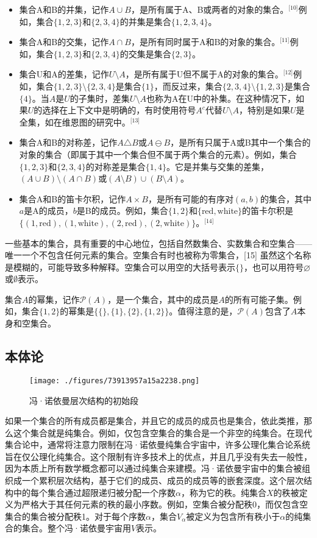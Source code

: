 \begin{itemize}
\item 集合A和B的并集，记作$A \cup B$，是所有属于A、B或两者的对象的集合。\(^\text{[10]}\)例如，集合$\{1, 2, 3\}$和$\{2, 3, 4\}$的并集是集合$\{1, 2, 3, 4\}$。
\item 集合A和B的交集，记作$A \cap B$，是所有同时属于A和B的对象的集合。\(^\text{[11]}\)例如，集合$\{1, 2, 3\}$和$\{2, 3, 4\}$的交集是集合$\{2, 3\}$。
\item 集合U和A的差集，记作$U \setminus A$，是所有属于U但不属于A的对象的集合。\(^\text{[12]}\)例如，集合$\{1, 2, 3\} \setminus \{2, 3, 4\}$是集合$\{1\}$，而反过来，集合$\{2, 3, 4\} \setminus \{1, 2, 3\}$是集合$\{4\}$。当$A$是$U$的子集时，差集$U \setminus A$也称为A在U中的补集。在这种情况下，如果$U$的选择在上下文中是明确的，有时使用符号$A^c$代替$U \setminus A$，特别是如果$U$是全集，如在维恩图的研究中。\(^\text{[13]}\)
\item 集合A和B的对称差，记作$A \triangle B$或$A \ominus B$，是所有只属于A或B其中一个集合的对象的集合（即属于其中一个集合但不属于两个集合的元素）。例如，集合$\{1, 2, 3\}$和$\{2, 3, 4\}$的对称差是集合$\{1, 4\}$。它是并集与交集的差集，$(A \cup B) \setminus (A \cap B)$或$(A \setminus B) \cup (B \setminus A)$。
\item 集合A和B的笛卡尔积，记作$A \times B$，是所有可能的有序对$(a, b)$的集合，其中$a$是A的成员，$b$是B的成员。例如，集合$\{1, 2\}$和$\{\text{red}, \text{white}\}$的笛卡尔积是$\{(1, \text{red}), (1, \text{white}), (2, \text{red}), (2, \text{white})\}$。\(^\text{[14]}\)
\end{itemize}
一些基本的集合，具有重要的中心地位，包括自然数集合、实数集合和空集合——唯一一个不包含任何元素的集合。空集合有时也被称为零集合，[15] 虽然这个名称是模糊的，可能导致多种解释。空集合可以用空的大括号表示$\{\}$，也可以用符号$\varnothing$或$\emptyset$表示。

集合$A$的幂集，记作${\mathcal {P}}(A)$，是一个集合，其中的成员是$A$的所有可能子集。例如，集合$\{1, 2\}$的幂集是$\{\{\}, \{1\}, \{2\}, \{1, 2\}\}$。值得注意的是，${\mathcal {P}}(A)$包含了$A$本身和空集合。
\subsection{本体论}
\begin{figure}[ht]
\centering
\texttt{[image: ./figures/73913957a15a2238.png]}
\caption{冯·诺依曼层次结构的初始段} \label{fig_Set1_6}
\end{figure}
如果一个集合的所有成员都是集合，并且它的成员的成员也是集合，依此类推，那么这个集合就是纯集合。例如，仅包含空集合的集合是一个非空的纯集合。在现代集合论中，通常将注意力限制在冯·诺依曼纯集合宇宙中，许多公理化集合论系统旨在仅公理化纯集合。这个限制有许多技术上的优点，并且几乎没有失去一般性，因为本质上所有数学概念都可以通过纯集合来建模。冯·诺依曼宇宙中的集合被组织成一个累积层次结构，基于它们的成员、成员的成员等的嵌套深度。这个层次结构中的每个集合通过超限递归被分配一个序数$\alpha$，称为它的秩。纯集合$X$的秩被定义为严格大于其任何元素的秩的最小序数。例如，空集合被分配秩0，而仅包含空集合的集合被分配秩1。对于每个序数$\alpha$，集合$V_{\alpha}$被定义为包含所有秩小于$\alpha$的纯集合的集合。整个冯·诺依曼宇宙用$V$表示。
